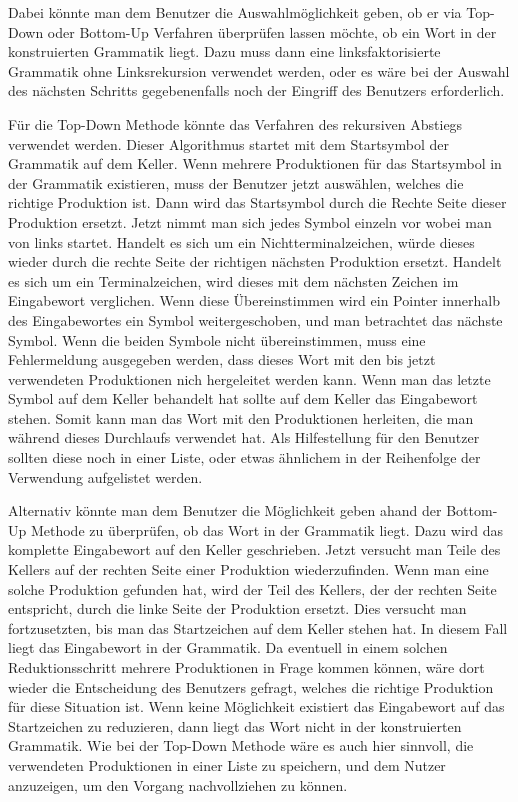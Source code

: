 Dabei könnte man dem Benutzer die Auswahlmöglichkeit geben, ob er via
Top-Down oder Bottom-Up Verfahren überprüfen lassen möchte, ob ein Wort in der
konstruierten Grammatik liegt. Dazu muss dann eine linksfaktorisierte Grammatik
ohne Linksrekursion verwendet werden, oder es wäre bei der Auswahl des nächsten
Schritts gegebenenfalls noch der Eingriff des Benutzers
erforderlich.\vspace{10pt}

Für die Top-Down Methode könnte das Verfahren des rekursiven Abstiegs verwendet
werden. Dieser Algorithmus startet mit dem Startsymbol der Grammatik auf dem
Keller. Wenn mehrere Produktionen für das Startsymbol in der Grammatik
existieren, muss der Benutzer jetzt auswählen, welches die richtige Produktion ist. Dann wird
das Startsymbol durch die Rechte Seite dieser Produktion ersetzt. Jetzt nimmt
man sich jedes Symbol einzeln vor wobei man von links startet. Handelt es sich
um ein Nichtterminalzeichen, würde dieses wieder durch die rechte Seite der
richtigen nächsten Produktion ersetzt. Handelt es sich um ein Terminalzeichen,
wird dieses mit dem nächsten Zeichen im Eingabewort verglichen. Wenn diese
Übereinstimmen wird ein Pointer innerhalb des Eingabewortes ein Symbol
weitergeschoben, und man betrachtet das nächste Symbol. Wenn die beiden Symbole
nicht übereinstimmen, muss eine Fehlermeldung ausgegeben werden, dass dieses
Wort mit den bis jetzt verwendeten Produktionen nich hergeleitet werden kann.
Wenn man das letzte Symbol auf dem Keller behandelt hat sollte auf dem Keller
das Eingabewort stehen. Somit kann man das Wort mit den Produktionen herleiten,
die man während dieses Durchlaufs verwendet hat. Als Hilfestellung für den
Benutzer sollten diese noch in einer Liste, oder etwas ähnlichem in der
Reihenfolge der Verwendung aufgelistet werden.\vspace{10pt}

Alternativ könnte man dem Benutzer die Möglichkeit geben ahand der Bottom-Up
Methode zu überprüfen, ob das Wort in der Grammatik liegt. Dazu wird das
komplette Eingabewort auf den Keller geschrieben. Jetzt versucht man Teile des
Kellers auf der rechten Seite einer Produktion wiederzufinden. Wenn man eine
solche Produktion gefunden hat, wird der Teil des Kellers, der der rechten
Seite entspricht, durch die linke Seite der Produktion ersetzt. Dies versucht
man fortzusetzten, bis man das Startzeichen auf dem Keller stehen hat. In
diesem Fall liegt das Eingabewort in der Grammatik. Da eventuell in einem
solchen Reduktionsschritt mehrere Produktionen in Frage kommen können, wäre
dort wieder die Entscheidung des Benutzers gefragt, welches die richtige
Produktion für diese Situation ist. Wenn keine Möglichkeit existiert das
Eingabewort auf das Startzeichen zu reduzieren, dann liegt das Wort nicht in
der konstruierten Grammatik. Wie bei der Top-Down Methode wäre es
auch hier sinnvoll, die verwendeten Produktionen in einer Liste zu
speichern, und dem Nutzer anzuzeigen, um den Vorgang nachvollziehen
zu können.\vspace{10pt}

